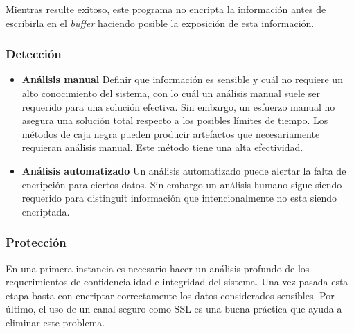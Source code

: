 Mientras resulte exitoso, este programa no encripta la información antes de escribirla en el \textit{buffer} haciendo posible la exposición de esta información.

\subsubsection{Detección}
\begin{itemize}
 \item \textbf{Análisis manual}
	Definir que información es sensible y cuál no requiere un alto conocimiento del sistema, con lo cuál un análisis manual suele ser requerido para una solución efectiva. 
	Sin embargo, un esfuerzo manual no asegura una solución total respecto a los posibles límites de tiempo. 
	Los métodos de caja negra pueden producir artefactos que necesariamente requieran análisis manual.
	Este método tiene una alta efectividad.
  \item \textbf{Análisis automatizado}
  Un análisis automatizado puede alertar la falta de encripción para ciertos datos.
  Sin embargo un análisis humano sigue siendo requerido para distinguit información que intencionalmente no esta siendo encriptada.
\end{itemize}

\subsubsection{Protección}

En una primera instancia es necesario hacer un análisis profundo de los requerimientos de confidencialidad e integridad del sistema. 
Una vez pasada esta etapa basta con encriptar correctamente los datos considerados sensibles.
Por último, el uso de un canal seguro como SSL es una buena práctica que ayuda a eliminar este problema.